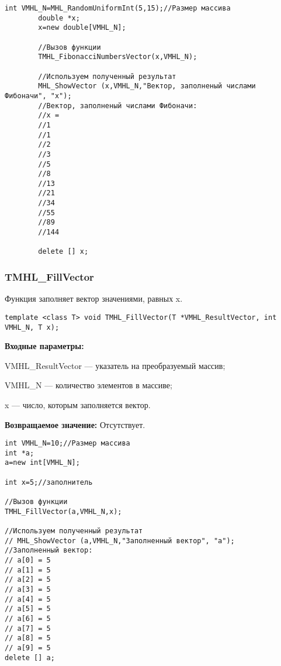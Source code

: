 \documentclass[a4paper,12pt]{article}
\begin{document}
\begin{lstlisting}[label=code_use_TMHL_FibonacciNumbersVector,caption=Пример использования]
        int VMHL_N=MHL_RandomUniformInt(5,15);//Размер массива
        double *x;
        x=new double[VMHL_N];

        //Вызов функции
        TMHL_FibonacciNumbersVector(x,VMHL_N);

        //Используем полученный результат
        MHL_ShowVector (x,VMHL_N,"Вектор, заполненый числами Фибоначи", "x");
        //Вектор, заполненый числами Фибоначи:
        //x =	
        //1
        //1
        //2
        //3
        //5
        //8
        //13
        //21
        //34
        //55
        //89
        //144
        
        delete [] x;
\end{lstlisting}

\subsubsection{TMHL\_FillVector}\label{TMHL_FillVector}

Функция заполняет вектор значениями, равных x.


\begin{lstlisting}[label=code_syntax_TMHL_FillVector,caption=Синтаксис]
template <class T> void TMHL_FillVector(T *VMHL_ResultVector, int VMHL_N, T x);
\end{lstlisting}

\textbf{Входные параметры:}

 VMHL\_ResultVector --- указатель на преобразуемый массив;
 
 VMHL\_N --- количество элементов в массиве;
 
 x --- число, которым заполняется вектор.

\textbf{Возвращаемое значение:}
Отсутствует.


\begin{lstlisting}[label=code_use_TMHL_FillVector,caption=Пример использования]
int VMHL_N=10;//Размер массива
int *a;
a=new int[VMHL_N];

int x=5;//заполнитель

//Вызов функции
TMHL_FillVector(a,VMHL_N,x);

//Используем полученный результат
// MHL_ShowVector (a,VMHL_N,"Заполненный вектор", "a");
//Заполненный вектор:
// a[0] = 5
// a[1] = 5
// a[2] = 5
// a[3] = 5
// a[4] = 5
// a[5] = 5
// a[6] = 5
// a[7] = 5
// a[8] = 5
// a[9] = 5
delete [] a;
\end{lstlisting}
\end{document}
